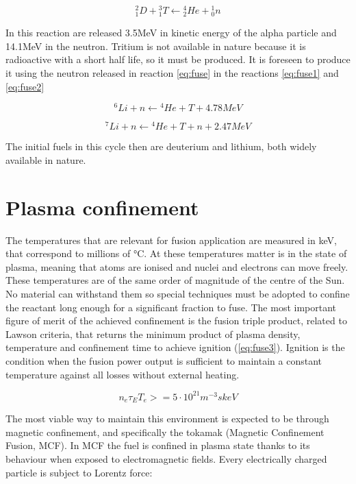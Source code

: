 \begin{equation}
{ }^2_1 D+ { }^3_1T \leftarrow { }^4_2He+{ }^1_0n
\label{eq:fuse}
\end{equation}

In this reaction are released 3.5MeV in kinetic energy of the alpha particle and 14.1MeV in the neutron. Tritium is not available in nature because it is radioactive with a short half life, so it must be produced. It is foreseen to produce it using the neutron released in reaction \ref{eq:fuse} in the reactions \ref{eq:fuse1} and \ref{eq:fuse2}

\begin{equation}
{}^{6}Li + n \leftarrow {}^{4}He +T +4.78MeV
\label{eq:fuse1}
\end{equation}

\begin{equation}
{}^{7}Li + n \leftarrow {}^{4}He +T +n +2.47MeV
\label{eq:fuse2}
\end{equation}

The initial fuels in this cycle then are deuterium and lithium, both widely available in nature.

\section{Plasma confinement}

The temperatures that are relevant for fusion application are measured in keV, that correspond to millions of °C. At these temperatures matter is in the state of plasma, meaning that atoms are ionised and nuclei and electrons can move freely. These temperatures are of the same order of magnitude of the centre of the Sun. No material can withstand them so special techniques must be adopted to confine the reactant long enough for a significant fraction to fuse. The most important figure of merit of the achieved confinement is the fusion triple product, related to Lawson criteria, that returns the minimum product of plasma density, temperature and confinement time to achieve ignition (\autoref{eq:fuse3}). Ignition is the condition when the fusion power output is sufficient to maintain a constant temperature against all losses without external heating.

\begin{equation}
{n_e} {\tau }_{E} T_e  >=  5\cdot{10}^{21}{ m }^{ -3 }skeV
\label{eq:fuse3}
\end{equation}

The most viable way to maintain this environment is expected to be
through magnetic confinement, and specifically the tokamak (Magnetic Confinement Fusion, MCF).
In MCF the fuel is confined in plasma state thanks to its behaviour when exposed to electromagnetic fields. Every electrically charged particle is subject to Lorentz force:


